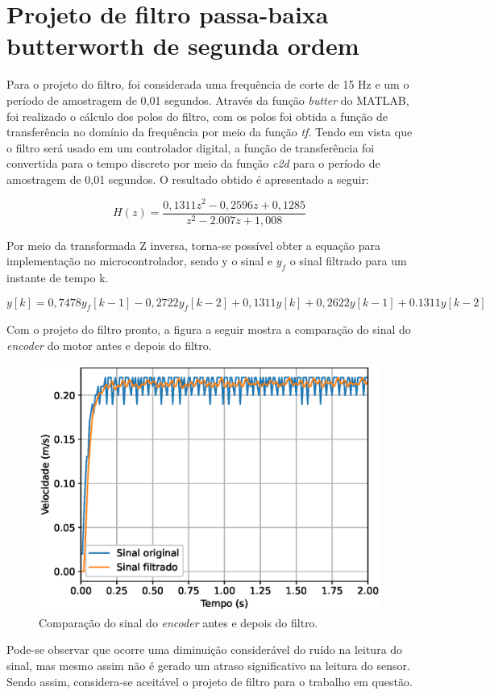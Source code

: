 \chapter{Projeto de filtro passa-baixa butterworth de segunda ordem}
\label{apend:1}
Para o projeto do filtro, foi considerada uma frequência de corte de 15 Hz e um o período de amostragem de 0,01 segundos. Através da função \textit{butter} do MATLAB, foi realizado o cálculo dos polos do filtro, com os polos foi obtida a função de transferência no domínio da frequência por meio da função \textit{tf}. Tendo em vista que o filtro será usado em um controlador digital, a função de transferência foi convertida para o tempo discreto por meio da função \textit{c2d} para o período de amostragem de 0,01 segundos. O resultado obtido é apresentado a seguir:

\begin{equation}
    H(z) = \frac{0,1311z^2-0,2596z+0,1285}{z^2-2.007z+1,008}
    \label{transformada_filtro}
\end{equation}

Por meio da transformada Z inversa, torna-se possível obter a equação para implementação no microcontrolador, sendo y o sinal e $y_f$ o sinal filtrado para um instante de tempo k.

\begin{equation}
    y[k]= 0,7478y_f[k-1] -0,2722y_f[k-2] +0,1311y[k] +0,2622y[k-1]+0.1311y[k-2]
    \label{filtro}
\end{equation}

Com o projeto do filtro pronto, a figura a seguir mostra a comparação do sinal do \textit{encoder} do motor antes e depois do filtro.

\begin{figure}[H]
    \centering
    \includegraphics[width=0.8\linewidth]{figuras/filtro_12V.eps}
    \caption[Comparação do sinal do \textit{encoder} antes e depois do filtro]{Comparação do sinal do \textit{encoder} antes e depois do filtro.}
    \label{fig:resp_filtr}
\end{figure}

Pode-se observar que ocorre uma diminuição considerável do ruído na leitura do sinal, mas mesmo assim não é gerado um atraso significativo na leitura do sensor. Sendo assim, considera-se aceitável o projeto de filtro para o trabalho em questão.